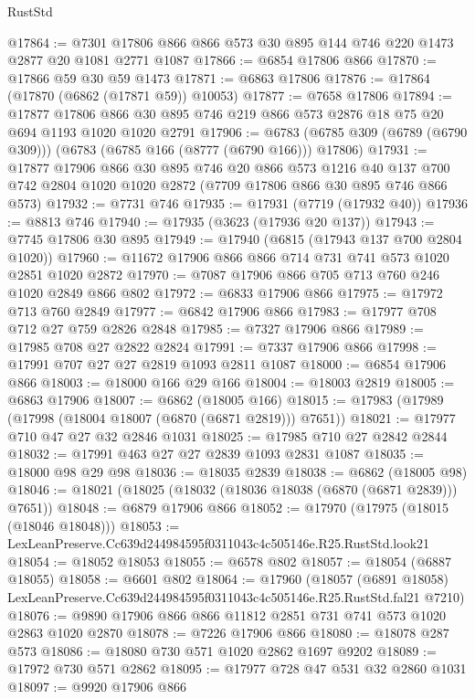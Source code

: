 \begin{lexlean}{RustStd}
\begin{coremodule}
@17864 := @7301 @17806 @866 @866 @573 @30 @895 @144 @746 @220 @1473 @2877 @20 @1081 @2771 @1087
@17866 := @6854 @17806 @866
@17870 := @17866 @59 @30 @59 @1473
@17871 := @6863 @17806
@17876 := @17864 (@17870 (@6862 (@17871 @59)) @10053)
@17877 := @7658 @17806
@17894 := @17877
    @17806
    @866
    @30
    @895
    @746
    @219
    @866
    @573
    @2876
    @18
    @75
    @20
    @694
    @1193
    @1020
    @1020
    @2791
@17906 := @6783 (@6785 @309 (@6789 (@6790 @309))) (@6783 (@6785 @166 (@8777 (@6790 @166))) @17806)
@17931 := @17877
    @17906
    @866
    @30
    @895
    @746
    @20
    @866
    @573
    @1216
    @40
    @137
    @700
    @742
    @2804
    @1020
    @1020
    @2872
    (@7709 @17806 @866 @30 @895 @746 @866 @573)
@17932 := @7731 @746
@17935 := @17931 (@7719 (@17932 @40))
@17936 := @8813 @746
@17940 := @17935 (@3623 (@17936 @20 @137))
@17943 := @7745 @17806 @30 @895
@17949 := @17940 (@6815 (@17943 @137 @700 @2804 @1020))
@17960 := @11672 @17906 @866 @866 @714 @731 @741 @573 @1020 @2851 @1020 @2872
@17970 := @7087 @17906 @866 @705 @713 @760 @246 @1020 @2849 @866 @802
@17972 := @6833 @17906 @866
@17975 := @17972 @713 @760 @2849
@17977 := @6842 @17906 @866
@17983 := @17977 @708 @712 @27 @759 @2826 @2848
@17985 := @7327 @17906 @866
@17989 := @17985 @708 @27 @2822 @2824
@17991 := @7337 @17906 @866
@17998 := @17991 @707 @27 @27 @2819 @1093 @2811 @1087
@18000 := @6854 @17906 @866
@18003 := @18000 @166 @29 @166
@18004 := @18003 @2819
@18005 := @6863 @17906
@18007 := @6862 (@18005 @166)
@18015 := @17983 (@17989 (@17998 (@18004 @18007 (@6870 (@6871 @2819))) @7651))
@18021 := @17977 @710 @47 @27 @32 @2846 @1031
@18025 := @17985 @710 @27 @2842 @2844
@18032 := @17991 @463 @27 @27 @2839 @1093 @2831 @1087
@18035 := @18000 @98 @29 @98
@18036 := @18035 @2839
@18038 := @6862 (@18005 @98)
@18046 := @18021 (@18025 (@18032 (@18036 @18038 (@6870 (@6871 @2839))) @7651))
@18048 := @6879 @17906 @866
@18052 := @17970 (@17975 (@18015 (@18046 @18048)))
@18053 := LexLeanPreserve.Cc639d244984595f0311043c4c505146e.R25.RustStd.look21
@18054 := @18052 @18053
@18055 := @6578 @802
@18057 := @18054 (@6887 @18055)
@18058 := @6601 @802
@18064 := @17960
    (@18057
      (@6891 @18058)
      LexLeanPreserve.Cc639d244984595f0311043c4c505146e.R25.RustStd.fal21
      @7210)
@18076 := @9890 @17906 @866 @866 @11812 @2851 @731 @741 @573 @1020 @2863 @1020 @2870
@18078 := @7226 @17906 @866
@18080 := @18078 @287 @573
@18086 := @18080 @730 @571 @1020 @2862 @1697 @9202
@18089 := @17972 @730 @571 @2862
@18095 := @17977 @728 @47 @531 @32 @2860 @1031
@18097 := @9920 @17906 @866

\end{coremodule}
\end{lexlean}
